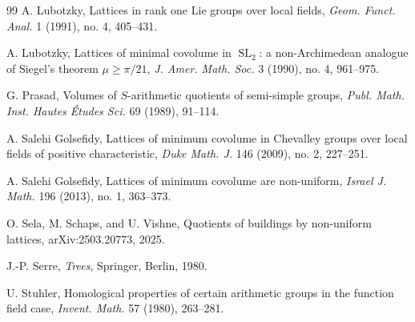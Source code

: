 \documentclass[11pt]{amsart}
\newcommand{\SL}{\operatorname{SL}}
\theoremstyle{plain}
\theoremstyle{definition}
\numberwithin{equation}{section}
\begin{document}
\begin{thebibliography}{99}
A. Lubotzky,
Lattices in rank one Lie groups over local fields,
\emph{Geom. Funct. Anal.} 1 (1991), no. 4, 405--431.


A. Lubotzky,
Lattices of minimal covolume in $\SL_2$: a non-Archimedean analogue of Siegel's theorem
\(\mu\ge\pi/21\),
\emph{J. Amer. Math. Soc.} 3 (1990), no. 4, 961--975.


G. Prasad,
Volumes of $S$-arithmetic quotients of semi-simple groups,
\emph{Publ. Math. Inst. Hautes \'Etudes Sci.} 69 (1989), 91--114.

A. Salehi Golsefidy,
Lattices of minimum covolume in Chevalley groups over local fields of positive
characteristic,
\emph{Duke Math. J.} 146 (2009), no. 2, 227--251.

A. Salehi Golsefidy,
Lattices of minimum covolume are non-uniform,
\emph{Israel J. Math.} 196 (2013), no. 1, 363--373.

O. Sela, M. Schaps, and U. Vishne,
Quotients of buildings by non-uniform lattices,
arXiv:2503.20773, 2025.

J.-P. Serre,
\emph{Trees}, Springer, Berlin, 1980.

U. Stuhler,
Homological properties of certain arithmetic groups in the function field case,
\emph{Invent. Math.} 57 (1980), 263--281.

\end{thebibliography}
\end{document}
